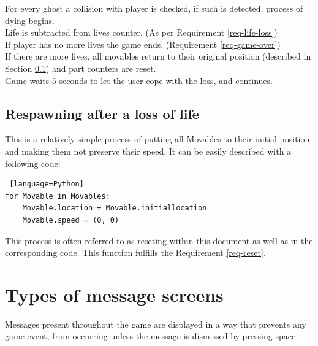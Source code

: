 \documentclass[11pt,a4paper,notitlepage]{report}
\newcommand{\dsubsection}[1]{\FloatBarrier \subsection{#1}}
\begin{document}
				For every ghost a collision with player is checked, if such is detected, process of dying begins.\\
				Life is subtracted from lives counter. (As per Requirement \ref{req-life-loss})\\
				If player has no more lives the game ends. (Requirement \ref{req-game-over})\\
				If there are more lives, all movables return to their original position (described in Section \ref{respawning})
				and part counters are reset.\\
				Game waits 5 seconds to let the user cope with the loss, and continues.
			\dsubsection{Respawning after a loss of life}
				\label{respawning}
				This is a relatively simple process of putting all Movables to their initial position and making them not preserve their speed. It can be easily described with a following code:
				\begin{lstlisting} [language=Python]
for Movable in Movables:
    Movable.location = Movable.initiallocation
    Movable.speed = (0, 0)
				\end{lstlisting}
				This process is often referred to as reseting within this document as well as in the corresponding code. This function fulfills the Requirement \ref{req-reset}.
		\section{Types of message screens}
			\label{typesofscreens}
			Messages present throughout the game are displayed in a way that prevents any game event, from occurring unless the message is dismissed by pressing space.
			
\end{document}

